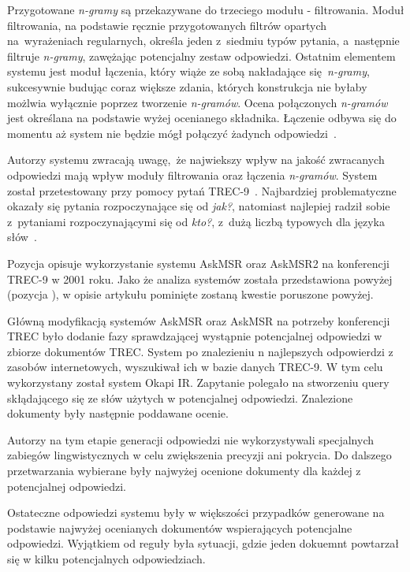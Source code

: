 Przygotowane \emph{n-gramy} są przekazywane do trzeciego modułu - filtrowania. Moduł filtrowania, na podstawie ręcznie przygotowanych filtrów opartych na~wyrażeniach regularnych, określa jeden z~siedmiu typów pytania, a~następnie filtruje \emph{n-gramy}, zawężając potencjalny zestaw odpowiedzi. Ostatnim elementem systemu jest moduł łączenia, który wiąże ze sobą nakładające się \emph{n-gramy}, sukcesywnie budując coraz większe zdania, których konstrukcja nie byłaby możlwia wyłącznie poprzez tworzenie \emph{n-gramów}. Ocena połączonych \emph{n-gramów} jest określana na podstawie wyżej ocenianego składnika. Łączenie odbywa się do momentu aż system nie będzie mógł połączyć żadynch odpowiedzi~\cite{brill2002analysis}.

Autorzy systemu zwracają uwagę, że najwiekszy wpływ na jakość zwracanych odpowiedzi mają wpływ moduły filtrowania oraz łączenia \emph{n-gramów}. System został przetestowany przy pomocy pytań TREC-9~\cite{voorhees2001trec}. Najbardziej problematyczne okazały się pytania rozpoczynające się od \emph{jak?}, natomiast najlepiej radził sobie z~pytaniami rozpoczynającymi się od \emph{kto?}, z~dużą liczbą typowych dla języka słów~\cite{brill2002analysis}.

Pozycja \cite{brill2001data} opisuje wykorzystanie systemu AskMSR oraz AskMSR2 na konferencji TREC-9 w 2001 roku. Jako że analiza systemów została przedstawiona powyżej (pozycja \cite{brill2002analysis}), w opisie artykułu pominięte zostaną kwestie poruszone powyżej.

Główną modyfikacją systemów AskMSR oraz AskMSR na potrzeby konferencji TREC było dodanie fazy sprawdzającej wystąpnie potencjalnej odpowiedzi w zbiorze dokumentów TREC. System po znalezieniu n najlepszych odpowierdzi z zasobów internetowych, wyszukiwał ich w bazie danych TREC-9. W tym celu wykorzystany został system Okapi IR. Zapytanie polegało na stworzeniu query skłądającego się ze słów użytych w potencjalnej odpowiedzi. Znalezione dokumenty były następnie poddawane ocenie.

Autorzy \cite{brill2001data} na tym etapie generacji odpowiedzi nie wykorzystywali specjalnych zabiegów lingwistycznych w celu zwiększenia precyzji ani pokrycia. Do dalszego przetwarzania wybierane były najwyżej ocenione dokumenty dla każdej z potencjalnej odpowiedzi.

Ostateczne odpowiedzi systemu były w większości przypadków generowane na podstawie najwyżej ocenianych dokumentów wspierających potencjalne odpowiedzi. Wyjątkiem od reguły była sytuacji, gdzie jeden dokuemnt powtarzał się w kilku potencjalnych odpowiedziach.


